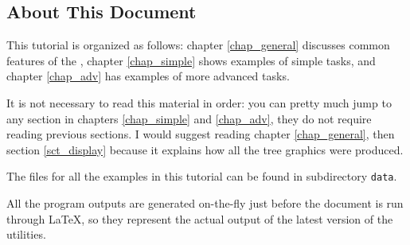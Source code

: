 \subsection*{About This Document}

This tutorial is organized as follows: chapter \ref{chap_general} discusses
common features of the \nutils, chapter \ref{chap_simple} shows examples of
simple tasks, and chapter \ref{chap_adv} has examples of more advanced tasks. 

It is not necessary to read this material in order: you can pretty much jump to
any section in chapters \ref{chap_simple} and \ref{chap_adv}, they do not
require reading previous sections. I would suggest reading chapter
\ref{chap_general}, then section \ref{sct_display} because it explains how all
the tree graphics were produced.

The files for all the examples in this tutorial can be found in
subdirectory \texttt{data}.

All the program outputs are generated on-the-fly just before the document is run
through \LaTeX{}, so they represent the actual output of the latest version of
the utilities.

